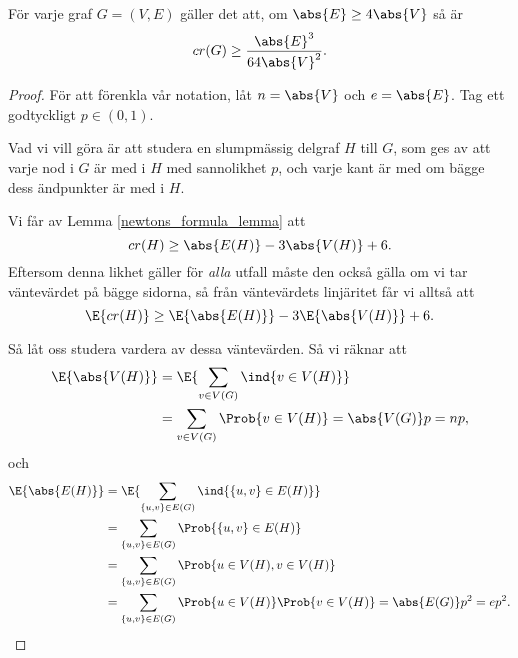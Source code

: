 \documentclass[nobib]{tufte-handout}
\begin{document}
\begin{theorem}
  För varje graf $G = (V,E)$ gäller det att, om $\abs{E} \geq 4\abs{V}$ så är
  $$cr(G) \geq \frac{\abs{E}^3}{64\abs{V}^2}.$$

  \begin{proof}
    För att förenkla vår notation, låt $n = \abs{V}$ och $e = \abs{E}$. Tag ett godtyckligt $p \in (0,1)$.

    Vad vi vill göra är att studera en slumpmässig delgraf $H$ till $G$, som ges av att varje nod i $G$ är med i $H$ med sannolikhet $p$, och varje kant är med om bägge dess ändpunkter är med i $H$.

    Vi får av Lemma \ref{newtons_formula_lemma} att
    $$cr(H) \geq \abs{E(H)} - 3\abs{V(H)} + 6.$$
    Eftersom denna likhet gäller för \emph{alla} utfall måste den också gälla om vi tar väntevärdet på bägge sidorna, så från väntevärdets linjäritet får vi alltså att
    \begin{equation}\label{eq:H_expectations_ineq}
      \E{cr(H)} \geq \E{\abs{E(H)}} - 3\E{\abs{V(H)}} + 6.
    \end{equation}

    Så låt oss studera vardera av dessa väntevärden. Så vi räknar att
    \begin{align*}
      \E{\abs{V(H)}} &= \E{\sum_{v \in V(G)} \ind{v \in V(H)}}\\
      &= \sum_{v \in V(G)} \Prob{v \in V(H)} = \abs{V(G)}p = np,
    \end{align*}
    och
    \begin{align*}
      \E{\abs{E(H)}} &= \E{\sum_{\{u,v\} \in E(G)} \ind{\{u,v\} \in E(H)}}\\
      &= \sum_{\{u,v\}\in E(G)} \Prob{\{u,v\} \in E(H)}\\
      &= \sum_{\{u,v\}\in E(G)} \Prob{u \in V(H), v \in V(H)}\\
      &= \sum_{\{u,v\}\in E(G)} \Prob{u \in V(H)}\Prob{v \in V(H)} = \abs{E(G)}p^2 = ep^2.
    \end{align*}


\end{proof}
\end{theorem}
\end{document}
